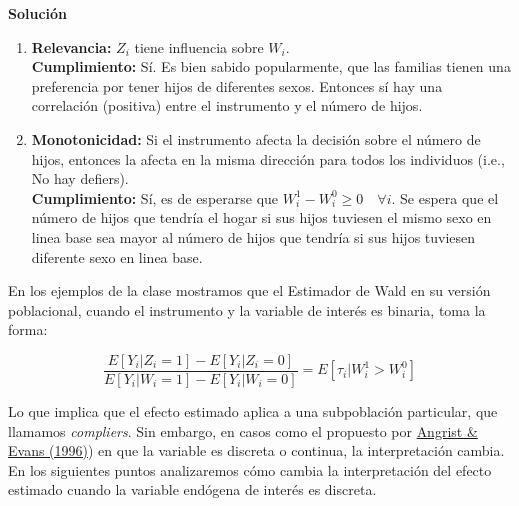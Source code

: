 \documentclass[a4paper, answers, addpoints, 11pt]{exam}
\newenvironment{solucion}{%
  \begin{mdframed}[
    backgroundcolor=blue!5,    %
    linecolor=blue!50,          %
    linewidth=2pt,              %
    leftmargin=10pt,            %
    rightmargin=8pt,           %
    topline=true,              %
    bottomline=true,            %
    roundcorner=10pt,           %
    innerleftmargin=10pt,       %
    innerrightmargin=10pt,      %
    innerbottommargin=10pt,     %
    innertopmargin=10pt         %
  ]%
  \begin{tcolorbox}[colframe=blue!50!black, colback=blue!50, coltitle=white, sharp corners=all, boxrule=1mm, width=\textwidth, halign=left, valign=center, top=0mm, bottom=0mm, left=0mm, right=0mm] \textbf{Solución} \end{tcolorbox} }{\end{mdframed}}
\begin{document}
\begin{enumerate}
\begin{solucion}
\begin{enumerate}
    \item \textbf{Relevancia:}  $Z_i$ tiene influencia sobre $W_i$. 
     \\
    \textbf{Cumplimiento:} Sí. Es bien sabido popularmente, que las familias tienen una preferencia por tener hijos de diferentes sexos. Entonces sí hay una correlación (positiva) entre el instrumento y el número de hijos.
    

    \item \textbf{Monotonicidad:} Si el instrumento afecta la decisi\'on sobre el número de hijos, entonces la afecta en la misma direcci\'on para todos los individuos (i.e., No hay defiers). \\
    \textbf{Cumplimiento:} Sí, es de esperarse que $ W_i^1 - W_i^0 \geq 0 \quad \forall i$. Se espera que el número de hijos que tendría el hogar si sus hijos tuviesen el mismo sexo en linea base sea mayor al número de hijos que tendría si sus hijos tuviesen diferente sexo en linea base.
\end{enumerate}
\end{solucion}
\end{enumerate}




En los ejemplos de la clase mostramos que el Estimador de Wald en su versión poblacional, cuando el instrumento y la variable de interés es binaria, toma la forma: 

    \begin{equation} \label{wald}
        \frac{E[Y_i| Z_i = 1] - E[Y_i| Z_i = 0]}{E[Y_i| W_i = 1] - E[Y_i| W_i = 0]} = E[\tau_i | W_i^1 > W_i^0]
    \end{equation}


\bigbreak
Lo que implica que el efecto estimado aplica a una subpoblación particular, que llamamos \textit{compliers}. Sin embargo, en casos como el propuesto por \href{https://www.nber.org/system/files/working_papers/w5778/w5778.pdf}{Angrist \& Evans (1996)}) en que la variable es discreta o continua, la interpretación cambia. En los siguientes puntos analizaremos cómo cambia la interpretación del efecto estimado cuando la variable endógena de interés es discreta.
\end{document}
